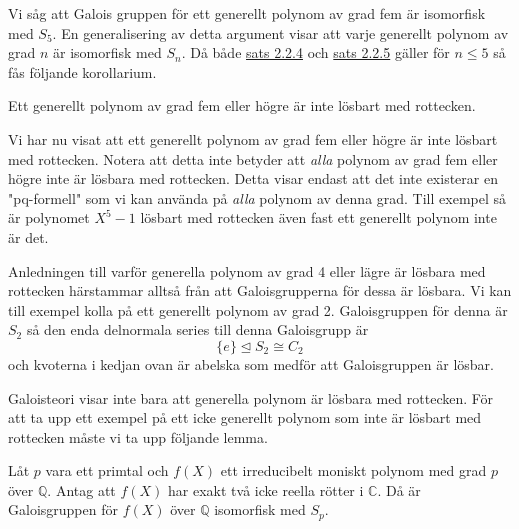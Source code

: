 \documentclass{article}
\theoremstyle{definition}
\begin{document}
Vi såg att Galois gruppen för ett generellt polynom av grad fem är isomorfisk med $S_5$. En generalisering av detta argument 
visar att varje generellt polynom av grad $n$ är isomorfisk med $S_n$. Då både \hyperlink{sats3.2.4}{sats 2.2.4} och \hyperlink{sats3.2.5}{sats 2.2.5}
gäller för $n \leq 5$ så fås följande korollarium. 

\begin{mykol}{}{}
  Ett generellt polynom av grad fem eller högre är inte lösbart med rottecken.
\end{mykol}
Vi har nu visat att ett generellt polynom av grad fem eller högre är inte lösbart med rottecken.
Notera att detta inte betyder att \textit{alla} polynom av grad fem eller högre inte är lösbara med rottecken. 
Detta visar endast att det inte existerar en "pq-formell" som vi kan använda på \textit{alla} polynom av denna grad. 
Till exempel så är polynomet $X^5 - 1$ lösbart med rottecken även fast ett generellt polynom inte är det.

Anledningen till varför generella polynom av grad 4 eller lägre är lösbara med rottecken härstammar alltså från att Galoisgrupperna för dessa är lösbara. 
Vi kan till exempel kolla på ett generellt polynom av grad 2. Galoisgruppen för denna är $S_2$ så den enda 
delnormala series till denna Galoisgrupp är 
\[\{e\} \trianglelefteq S_2 \cong C_2\]
och kvoterna i kedjan ovan är abelska som medför att Galoisgruppen är lösbar.

Galoisteori visar inte bara att generella polynom är lösbara med rottecken. För att ta upp ett exempel på ett icke generellt polynom som inte 
är lösbart med rottecken måste vi ta upp följande lemma.

\hypertarget{lemma11.0.1}{}
\begin{mylemma}{}{}
  Låt $p$ vara ett primtal och $f(X)$ ett irreducibelt moniskt polynom med grad $p$ över $\mathbb{Q}$. 
  Antag att $f(X)$ har exakt två icke reella rötter i $\mathbb{C}$. Då är Galoisgruppen för $f(X)$ över $\mathbb{Q}$ isomorfisk med 
  $S_p$.
\end{mylemma}
\end{document}
